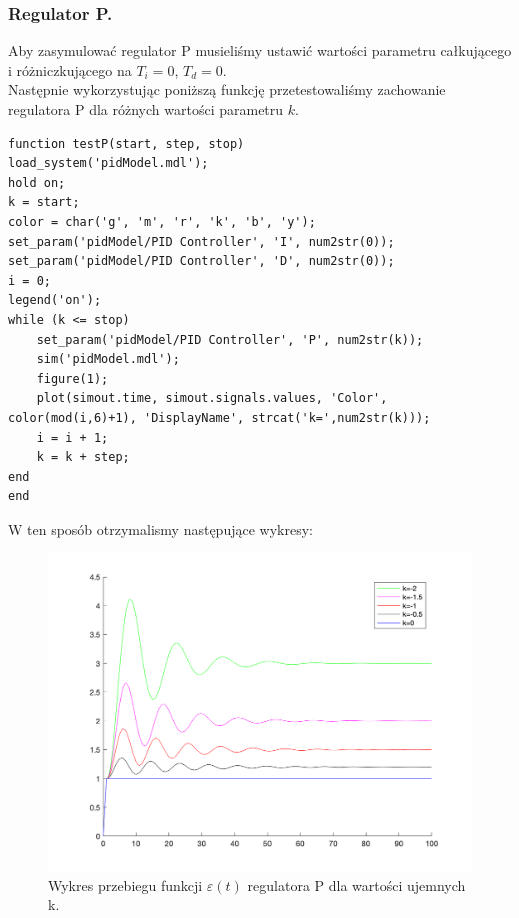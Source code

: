 \documentclass[a4paper,10pt]{article}
\begin{document}
\subsubsection{Regulator P.}\label{sec:regP}
Aby zasymulować regulator P musieliśmy ustawić wartości parametru całkującego i różniczkującego na $T_{i}=0$, $T_{d}=0$. \\
Następnie wykorzystując poniższą funkcję przetestowaliśmy zachowanie regulatora P dla różnych wartości parametru $k$. \\
\begin{lstlisting}[caption=Funkcja testująca regulator P.]
function testP(start, step, stop)
load_system('pidModel.mdl');
hold on;
k = start;
color = char('g', 'm', 'r', 'k', 'b', 'y');
set_param('pidModel/PID Controller', 'I', num2str(0));
set_param('pidModel/PID Controller', 'D', num2str(0));
i = 0;
legend('on');
while (k <= stop)
	set_param('pidModel/PID Controller', 'P', num2str(k));
	sim('pidModel.mdl');
	figure(1);
	plot(simout.time, simout.signals.values, 'Color', color(mod(i,6)+1), 'DisplayName', strcat('k=',num2str(k)));
	i = i + 1;
	k = k + step;
end
end
\end{lstlisting}
W ten sposób otrzymalismy następujące wykresy: \\
\begin{figure}[!h]
    \centering
	\includegraphics[width=130mm]{P-ku.png}
	\caption{Wykres przebiegu funkcji $\varepsilon(t)$ regulatora P dla wartości ujemnych k.}
    \label{fig:regulatorPeu}
\end{figure}
\end{document}
